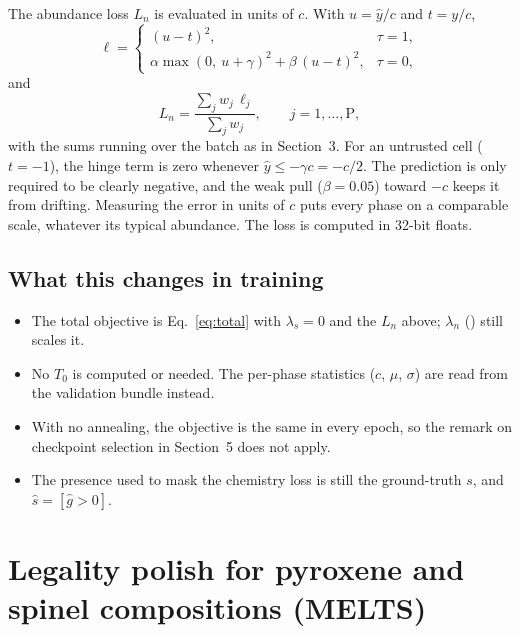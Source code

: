 \documentclass[11pt]{article}
\newcommand{\code}[1]{\texttt{\detokenize{#1}}}
\begin{document}
The abundance loss $L_n$ is evaluated in units of $c$. With $u = \hat y/c$ and $t = y/c$,
\begin{equation}
  \ell = \begin{cases}
    (u - t)^2, & \tau = 1,\\[2pt]
    \alpha \max(0,\ u + \gamma)^2 + \beta\,(u - t)^2, & \tau = 0,
  \end{cases}
  \label{eq:affloss}
\end{equation}
and
\begin{equation}
  L_n = \frac{\sum_j w_j\, \ell_j}{\sum_j w_j}, \qquad j = 1,\dots,\text{P},
\end{equation}
with the sums running over the batch as in Section~3. For an untrusted cell ($t = -1$), the
hinge term is zero whenever $\hat y \le -\gamma c = -c/2$. The prediction is only required
to be clearly negative, and the weak pull ($\beta = 0.05$) toward $-c$ keeps it from
drifting. Measuring the error in units of $c$ puts every phase on a comparable scale,
whatever its typical abundance. The loss is computed in 32-bit floats.

\subsection{What this changes in training}
\begin{itemize}[nosep]
  \item The total objective is Eq.~\eqref{eq:total} with $\lambda_s = 0$ and the $L_n$
        above; $\lambda_n$ (\code{loss_config.moles.weight}) still scales it.
  \item No $T_0$ is computed or needed. The per-phase statistics ($c$, $\mu$, $\sigma$) are
        read from the validation bundle instead.
  \item With no annealing, the objective is the same in every epoch, so the remark on
        checkpoint selection in Section~5 does not apply.
  \item The presence used to mask the chemistry loss is still the ground-truth $s$, and
        $\hat s = [\hat g > 0]$.
\end{itemize}


\section{Legality polish for pyroxene and spinel compositions (MELTS)}
\label{sec:polish}
\end{document}
